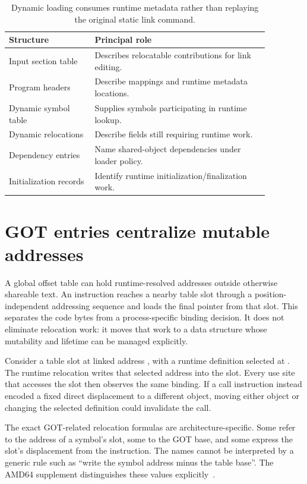 \begin{table}[htbp]
\caption{Dynamic loading consumes runtime metadata rather than replaying the original static link command.}
\label{tab:ch59-records}
\centering
\begin{tabular}{p{0.29\linewidth}p{0.58\linewidth}}
\toprule
Structure & Principal role \\
\midrule
Input section table & Describes relocatable contributions for link editing. \\
Program headers & Describe mappings and runtime metadata locations. \\
Dynamic symbol table & Supplies symbols participating in runtime lookup. \\
Dynamic relocations & Describe fields still requiring runtime work. \\
Dependency entries & Name shared-object dependencies under loader policy. \\
Initialization records & Identify runtime initialization/finalization work. \\
\bottomrule
\end{tabular}
\end{table}

\section{GOT entries centralize mutable addresses}
\label{sec:ch59-got}

A global offset table can hold runtime-resolved addresses outside otherwise shareable text.
An instruction reaches a nearby table slot through a position-independent addressing sequence and loads the final pointer from that slot.
This separates the code bytes from a process-specific binding decision.
It does not eliminate relocation work: it moves that work to a data structure whose mutability and lifetime can be managed explicitly.

Consider a table slot at linked address , with a runtime definition selected at .
The runtime relocation writes that selected address into the slot.
Every use site that accesses the slot then observes the same binding.
If a call instruction instead encoded a fixed direct displacement to a different object, moving either object or changing the selected definition could invalidate the call.

The exact GOT-related relocation formulas are architecture-specific.
Some refer to the address of a symbol's slot, some to the GOT base, and some express the slot's displacement from the instruction.
The names cannot be interpreted by a generic rule such as \enquote{write the symbol address minus the table base}.
The AMD64 supplement distinguishes these values explicitly~\cite{matz-2012-amd64}.

